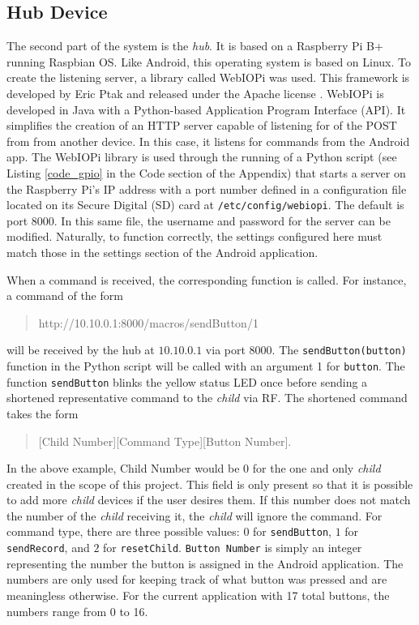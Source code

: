 \documentclass[12pt]{article}
\begin{document}
 
 \subsection*{Hub Device}
The second part of the system is the \emph{hub}. It is based on a Raspberry Pi B+ running Raspbian OS. Like Android, this operating system is based on Linux. To create the listening server, a library called WebIOPi was used. This framework is developed by Eric Ptak and released under the Apache license \cite{webiopi}. WebIOPi is developed in Java with a Python-based Application Program Interface (API). It simplifies the creation of an HTTP server capable of listening for of the POST from from another device. In this case, it listens for commands from the Android app. The WebIOPi library is used through the running of a Python script (see Listing \ref{code_gpio} in the Code section of the Appendix) that starts a server on the Raspberry Pi's IP address with a port number defined in a configuration file located on its Secure Digital (SD) card at \texttt{/etc/config/webiopi}. The default is port $8000$. In this same file, the username and password for the server can be modified. Naturally, to function correctly, the settings configured here must match those in the settings section of the Android application.
 
When a command is received, the corresponding function is called. For instance, a command of the form 
 \begin{quote}
 http://10.10.0.1:8000/macros/sendButton/1
 \end{quote}
 will be received by the hub at $10.10.0.1$ via port $8000$. The \texttt{sendButton(button)} function in the Python script will be called with an argument 1 for \texttt{button}. The function \texttt{sendButton} blinks the yellow status LED once before sending a shortened representative command to the \emph{child} via RF. The shortened command takes the form 
 \begin{quote}
[Child Number][Command Type][Button Number].
 \end{quote}
In the above example, Child Number would be 0 for the one and only \emph{child} created in the scope of this project. This field is only present so that it is possible to add more \emph{child} devices if the user desires them. If this number does not match the number of the \emph{child} receiving it, the \emph{child} will ignore the command. For command type, there are three possible values: $0$ for \texttt{sendButton}, $1$ for \texttt{sendRecord}, and $2$ for \texttt{resetChild}. \texttt{Button Number} is simply an integer representing the number the button is assigned in the Android application. The numbers are only used for keeping track of what button was pressed and are meaningless otherwise. For the current application with 17 total buttons, the numbers range from 0 to 16.
\end{document}
